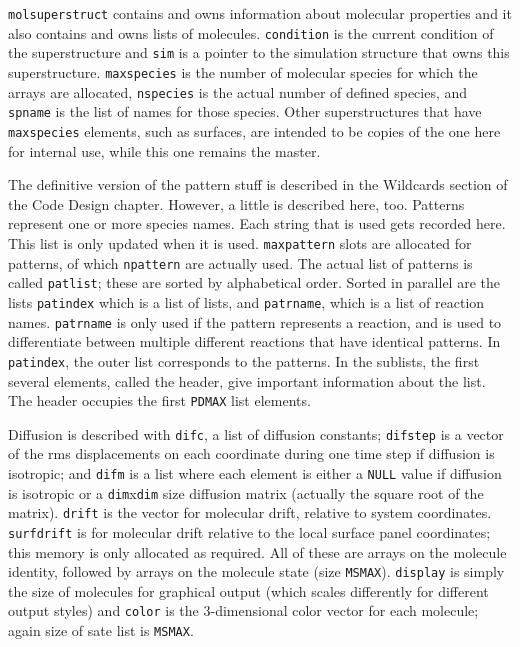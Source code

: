 \documentclass {scrbook}
\newcommand {\ttt} {\texttt}
\begin{document}
\ttt{molsuperstruct} contains and owns information about molecular properties and it also contains and owns lists of molecules. \ttt{condition} is the current condition of the superstructure and \ttt{sim} is a pointer to the simulation structure that owns this superstructure. \ttt{maxspecies} is the number of molecular species for which the arrays are allocated, \ttt{nspecies} is the actual number of defined species, and \ttt{spname} is the list of names for those species. Other superstructures that have \ttt{maxspecies} elements, such as surfaces, are intended to be copies of the one here for internal use, while this one remains the master.

The definitive version of the pattern stuff is described in the Wildcards section of the Code Design chapter. However, a little is described here, too. Patterns represent one or more species names. Each string that is used gets recorded here. This list is only updated when it is used. \ttt{maxpattern} slots are allocated for patterns, of which \ttt{npattern} are actually used. The actual list of patterns is called \ttt{patlist}; these are sorted by alphabetical order. Sorted in parallel are the lists \ttt{patindex} which is a list of lists, and \ttt{patrname}, which is a list of reaction names. \ttt{patrname} is only used if the pattern represents a reaction, and is used to differentiate between multiple different reactions that have identical patterns. In \ttt{patindex}, the outer list corresponds to the patterns. In the sublists, the first several elements, called the header, give important information about the list. The header occupies the first \ttt{PDMAX} list elements.

Diffusion is described with \ttt{difc}, a list of diffusion constants; \ttt{difstep} is a vector of the rms displacements on each coordinate during one time step if diffusion is isotropic; and \ttt{difm} is a list where each element is either a \ttt{NULL} value if diffusion is isotropic or a \ttt{dim}x\ttt{dim} size diffusion matrix (actually the square root of the matrix). \ttt{drift} is the vector for molecular drift, relative to system coordinates. \ttt{surfdrift} is for molecular drift relative to the local surface panel coordinates; this memory is only allocated as required. All of these are arrays on the molecule identity, followed by arrays on the molecule state (size \ttt{MSMAX}). \ttt{display} is simply the size of molecules for graphical output (which scales differently for different output styles) and \ttt{color} is the 3-dimensional color vector for each molecule; again size of sate list is \ttt{MSMAX}.
\end{document}
